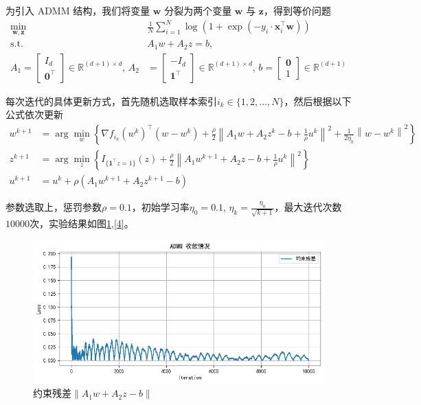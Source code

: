 \documentclass{homework}
\begin{document}
\question

\begin{sol}
    为引入 ADMM 结构，我们将变量 \(\bm{w}\) 分裂为两个变量 \(\bm{w}\) 与 \(\bm{z}\)，得到等价问题
\begin{align*}
\min_{\bm{w}, \bm{z}} \quad & \frac{1}{N} \sum_{i=1}^N \log\left(1 + \exp\left(-y_i \cdot \bm{x}_i^\top \bm{w}\right)\right) \\
\text{s.t.} \quad&A_1w+A_2z = b,\\
A_1 = \begin{bmatrix}
I_d \\
\bm{0}^\top
\end{bmatrix} \in \mathbb{R}^{(d+1) \times d},\,
A_2 &= \begin{bmatrix}
- I_d \\
\bm{1}^\top
\end{bmatrix} \in \mathbb{R}^{(d+1) \times d},\,
b   = \begin{bmatrix}
\bm{0} \\
1
\end{bmatrix} \in \mathbb{R}^{(d+1)}
\end{align*}

每次迭代的具体更新方式，首先随机选取样本索引$i_k \in \{1, 2, \dots, N\}$，然后根据以下公式依次更新
\begin{align}
w^{k+1} &= \arg\min_w \left\{ \nabla f_{i_k}(w^k)^\top (w - w^k) + \frac{\rho}{2} \left\| A_1 w + A_2 z^k - b + \frac{1}{\rho} u^k \right\|^2 + \frac{1}{2 \eta_k} \left\| w - w^k \right\|^2 \right\} \label{eq:update_w} \\
z^{k+1} &= \arg\min_z \left\{ I_{\{\mathbf{1}^\top z = 1\}}(z) + \frac{\rho}{2} \left\| A_1 w^{k+1} + A_2z - b + \frac{1}{\rho} u^k \right\|^2 \right\} \label{eq:update_z} \\
u^{k+1} &= u^k + \rho \left( A_1 w^{k+1} + A_2 z^{k+1} - b \right) \label{eq:update_u}
\end{align}

参数选取上，惩罚参数$\rho = 0.1$，初始学习率$\eta_0 = 0.1$, $\eta_k = \frac {\eta_0}{\sqrt{k+1}}$，最大迭代次数$10000$次，实验结果如图\ref{3},\ref{4}。

\begin{figure}[h]
    \centering
    \includegraphics[width=0.6\linewidth]{3.png}
    \caption{约束残差$\|A_1w+A_2z - b\|$}
    \label{3}
\end{figure}


\end{sol}
\end{document}
